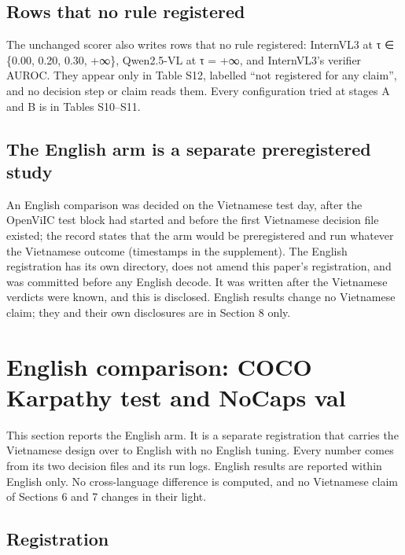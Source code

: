 \subsection{Rows that no rule registered}\label{rows-that-no-rule-registered}

The unchanged scorer also writes rows that no rule registered: InternVL3 at τ ∈ \{0.00, 0.20, 0.30,
+∞\}, Qwen2.5-VL at τ = +∞, and InternVL3's verifier AUROC. They appear only in Table S12, labelled
``not registered for any claim'', and no decision step or claim reads them. Every configuration
tried at stages A and B is in Tables S10--S11.

\subsection{The English arm is a separate preregistered
study}\label{the-english-arm-is-a-separate-preregistered-study}

An English comparison was decided on the Vietnamese test day, after the OpenViIC test block had
started and before the first Vietnamese decision file existed; the record states that the arm would
be preregistered and run whatever the Vietnamese outcome (timestamps in the supplement). The English
registration has its own directory, does not amend this paper's registration, and was committed
before any English decode. It was written after the Vietnamese verdicts were known, and this is
disclosed. English results change no Vietnamese claim; they and their own disclosures are in Section
8 only.

\section{English comparison: COCO Karpathy test and NoCaps
val}\label{english-comparison-coco-karpathy-test-and-nocaps-val}

This section reports the English arm. It is a separate registration that carries the Vietnamese
design over to English with no English tuning. Every number comes from its two decision files and
its run logs. English results are reported within English only. No cross-language difference is
computed, and no Vietnamese claim of Sections 6 and 7 changes in their light.

\subsection{Registration}\label{registration}

